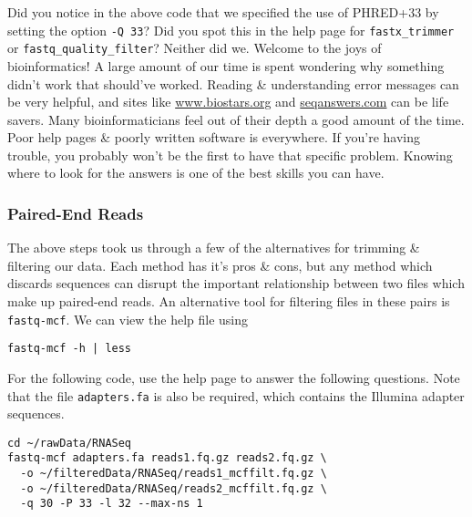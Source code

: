 \begin{advanced}
Did you notice in the above code that we specified the use of PHRED+33 by setting the option \texttt{-Q 33}?
Did you spot this in the help page for \texttt{fastx_trimmer} or \texttt{fastq_quality_filter}?
Neither did we.
Welcome to the joys of bioinformatics!
A large amount of our time is spent wondering why something didn't work that should've worked.
Reading \& understanding error messages can be very helpful, and sites like \url{www.biostars.org} and \url{seqanswers.com} can be life savers.
Many bioinformaticians feel out of their depth a good amount of the time.
Poor help pages \& poorly written software is everywhere.
If you're having trouble, you probably won't be the first to have that specific problem.
Knowing where to look for the answers is one of the best skills you can have.
\end{advanced}


\subsubsection{Paired-End Reads}
\begin{information}
The above steps took us through a few of the alternatives for trimming \& filtering our data.
Each method has it's pros \& cons, but any method which discards sequences can disrupt the important relationship between two files which make up paired-end reads.
An alternative tool for filtering files in these pairs is \texttt{fastq-mcf}.
We can view the help file using
\begin{lstlisting}
fastq-mcf -h | less
\end{lstlisting}
\end{information}

\begin{steps}
For the following code, use the help page to answer the following questions.
Note that the file \texttt{adapters.fa} is also be required, which contains the Illumina adapter sequences. \\
\end{steps}
\begin{minipage}{\textwidth}
\begin{lstlisting}
cd ~/rawData/RNASeq
fastq-mcf adapters.fa reads1.fq.gz reads2.fq.gz \
  -o ~/filteredData/RNASeq/reads1_mcffilt.fq.gz \
  -o ~/filteredData/RNASeq/reads2_mcffilt.fq.gz \
  -q 30 -P 33 -l 32 --max-ns 1  
\end{lstlisting}
\end{minipage}

